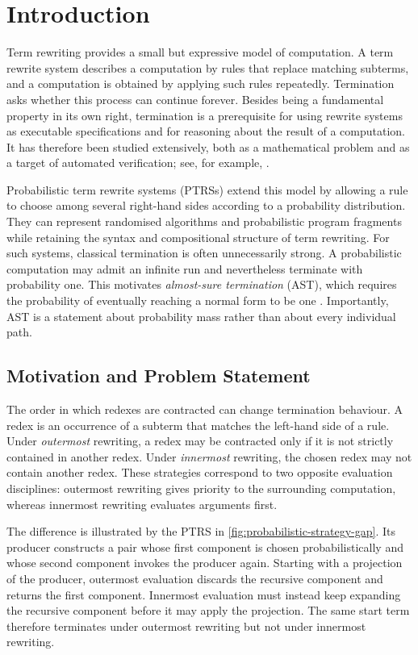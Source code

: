 \chapter{Introduction}\label{chap:introduction}

Term rewriting provides a small but expressive model of computation.  A term
rewrite system describes a computation by rules that replace matching subterms,
and a computation is obtained by applying such rules repeatedly.  Termination
asks whether this process can continue forever.  Besides being a fundamental
property in its own right, termination is a prerequisite for using rewrite
systems as executable specifications and for reasoning about the result of a
computation.  It has therefore been studied extensively, both as a mathematical
problem and as a target of automated verification; see, for example,
\cite{baader_nipkow_1999}.

Probabilistic term rewrite systems (PTRSs) extend this model by allowing a rule
to choose among several right-hand sides according to a probability
distribution.  They can represent randomised algorithms and probabilistic
program fragments while retaining the syntax and compositional structure of
term rewriting.  For such systems, classical termination is often unnecessarily
strong.  A probabilistic computation may admit an infinite run and nevertheless
terminate with probability one.  This motivates \emph{almost-sure termination}
(AST), which requires the probability of eventually reaching a normal form to
be one \cite{avanzini_dallago_yamada_2020}.  Importantly, AST is a statement
about probability mass rather than about every individual path.

\section{Motivation and Problem Statement}

The order in which redexes are contracted can change termination behaviour.  A
redex is an occurrence of a subterm that matches the left-hand side of a rule.
Under \emph{outermost} rewriting, a redex may be contracted only if it is not
strictly contained in another redex.  Under \emph{innermost} rewriting, the
chosen redex may not contain another redex.  These strategies correspond to two
opposite evaluation disciplines: outermost rewriting gives priority to the
surrounding computation, whereas innermost rewriting evaluates arguments first.

The difference is illustrated by the PTRS in
\cref{fig:probabilistic-strategy-gap}.  Its producer constructs a pair whose
first component is chosen probabilistically and whose second component invokes
the producer again.  Starting with a projection of the producer, outermost
evaluation discards the recursive component and returns the first component.
Innermost evaluation must instead keep expanding the recursive component before
it may apply the projection.  The same start term therefore terminates under
outermost rewriting but not under innermost rewriting.


